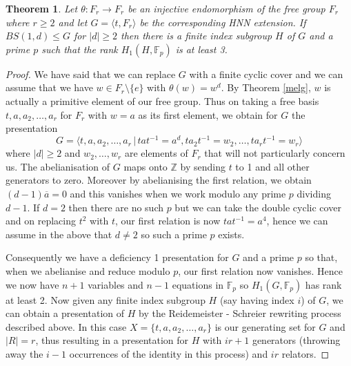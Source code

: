 \documentclass[11pt,reqno]{amsart}
\numberwithin{equation}{section}
\newcommand{\Z}{\mathbb{Z}}
\newcommand{\F}{\mathbb{F}}
\newcommand{\leqs}{\leqslant}
\newcommand{\geqs}{\geqslant}
\newtheorem{thm}{Theorem}[section]
\theoremstyle{definition}
\theoremstyle{remark}
\begin{document}
    \begin{thm} \label{main}
      Let $\theta:F_r\rightarrow F_r$ be an injective endomorphism
  of the free group $F_r$ where $r\geqs 2$ and let
  $G=\langle t,F_r\rangle$ be
  the corresponding HNN extension. If $BS(1,d)\leqs G$ for $|d|\geq 2$
  then there is
  a finite index subgroup $H$ of $G$ and a prime $p$ such that the rank
  $H_1(H,\F_p)$ is at least 3.
\end{thm}
\begin{proof}
  We have said that we can replace $G$ with a finite cyclic cover
and we can assume
  that we have $w\in F_r\setminus\{e\}$ with $\theta(w)=w^d$.
By Theorem \ref{melg}, $w$ is
actually a primitive element of our free group.
  Thus on taking a free basis $t,a,a_2,\ldots ,a_r$ for $F_r$ with $w=a$ as its
  first element, we obtain for $G$ the presentation
\[G=\langle t,a,a_2, \ldots ,a_r\,|\,tat^{-1}=a^d,
  ta_2t^{-1}=w_2,\ldots ,ta_rt^{-1}=
  w_r\rangle\]
where $|d|\geqs 2$ and $w_2,\ldots ,w_r$ are elements of $F_r$ that will not
particularly concern us.
The abelianisation of $G$ maps onto $\Z$ by sending
$t$ to 1 and all other generators to zero. Moreover by abelianising
the first relation, we obtain $(d-1)\overline{a}=0$ and this vanishes
when we work modulo any prime $p$ dividing $d-1$. If $d=2$ then there are
no such $p$ but we can take the double cyclic cover and on replacing
$t^2$ with $t$, our first relation is now $tat^{-1}=a^4$, hence we can
assume in the above that $d\neq 2$ so such a prime $p$ exists.

Consequently
we have a deficiency 1 presentation for $G$ and a prime $p$ so that, when we
abelianise and reduce modulo $p$, our first relation now vanishes. Hence
we now have $n+1$ variables and $n-1$ equations in $\F_p$ so
$H_1(G,\F_p)$ has rank at least 2. Now given any
finite index subgroup $H$ (say having index $i$)
of $G$, we can obtain a
presentation of $H$ by the Reidemeister - Schreier rewriting process
described above. In this case
$X=\{t,a,a_2,\ldots ,a_r\}$ is our generating set for $G$
and $|R|=r$, thus resulting in a
presentation for $H$ with $ir+1$ generators (throwing away the $i-1$
occurrences of the identity in this process) and $ir$ relators.


\end{proof}
\end{document}
